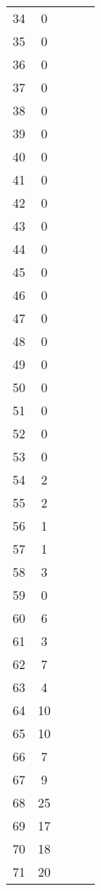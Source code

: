\begin{center}
\begin{table}[H]
\begin{tabular}{ccccc}
\num{   34} & \num{    0} \\
\num{   35} & \num{    0} \\
\num{   36} & \num{    0} \\
\num{   37} & \num{    0} \\
\num{   38} & \num{    0} \\
\num{   39} & \num{    0} \\
\num{   40} & \num{    0} \\
\num{   41} & \num{    0} \\
\num{   42} & \num{    0} \\
\num{   43} & \num{    0} \\
\num{   44} & \num{    0} \\
\num{   45} & \num{    0} \\
\num{   46} & \num{    0} \\
\num{   47} & \num{    0} \\
\num{   48} & \num{    0} \\
\num{   49} & \num{    0} \\
\num{   50} & \num{    0} \\
\num{   51} & \num{    0} \\
\num{   52} & \num{    0} \\
\num{   53} & \num{    0} \\
\num{   54} & \num{    2} \\
\num{   55} & \num{    2} \\
\num{   56} & \num{    1} \\
\num{   57} & \num{    1} \\
\num{   58} & \num{    3} \\
\num{   59} & \num{    0} \\
\num{   60} & \num{    6} \\
\num{   61} & \num{    3} \\
\num{   62} & \num{    7} \\
\num{   63} & \num{    4} \\
\num{   64} & \num{   10} \\
\num{   65} & \num{   10} \\
\num{   66} & \num{    7} \\
\num{   67} & \num{    9} \\
\num{   68} & \num{   25} \\
\num{   69} & \num{   17} \\
\num{   70} & \num{   18} \\
\num{   71} & \num{   20} \\

\end{tabular}
\end{table}
\end{center}
